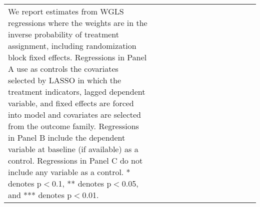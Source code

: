 \begin{table}[H]
\begin{tabular}{@{\extracolsep{0pt}}lccccccccccccc}
{{We report estimates from WGLS regressions where the weights are in the inverse probability of treatment 
assignment, including randomization block fixed effects. 
Regressions in Panel A use as controls the covariates selected by LASSO in which the treatment indicators,
lagged dependent variable, and fixed effects are forced into model and covariates are selected from the outcome family.
Regressions in Panel B include the dependent variable at baseline (if available) as a control. 
Regressions in Panel C do not include any variable as a control. 
* denotes p$<$0.1, ** denotes p$<$0.05, and *** denotes p$<$0.01.}} \\\end{tabular} \end{table} 